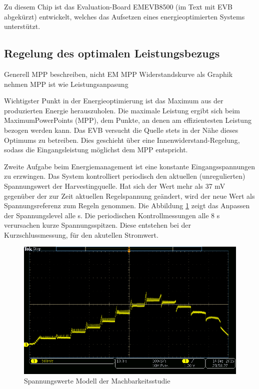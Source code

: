 
Zu diesem Chip ist das Evaluation-Board EMEVB8500 (im Text mit EVB abgekürzt) entwickelt, welches das Aufsetzen eines energieoptimierten Systems unterstützt. 


\subsection{Regelung des optimalen Leistungsbezugs}

Generell MPP beschreiben, nicht EM MPP
Widerstandskurve als Graphik nehmen
MPP ist wie Leistungsanpasung

Wichtigster Punkt in der Energieoptimierung ist das Maximum aus der produzierten Energie herauszuholen. Die maximale Leistung ergibt sich beim MaximumPowerPoints (MPP), dem Punkte, an denen am effizientesten Leistung bezogen werden kann. 
Das EVB versucht die Quelle stets in der Nähe dieses Optimums zu betreiben. Dies geschieht über eine Innenwiderstand-Regelung, sodass die Eingangsleistung möglichst dem MPP entspricht.

Zweite Aufgabe beim Energiemanagement ist eine konstante Eingangsspannungen zu erzwingen. Das System kontrolliert periodisch den aktuellen (unregulierten) Spannungswert der Harvestingquelle. Hat sich der Wert mehr als 37 mV gegenüber der zur Zeit aktuellen Regelspannung geändert, wird der neue Wert als Spannungsreferenz zum Regeln genommen. Die Abbildung \ref{RegelungSpannung} zeigt das Anpassen der Spannungslevel alle s. Die periodischen Kontrollmessungen alle 8 s verursachen kurze Spannungsspitzen. Diese entstehen bei der Kurzschlussmessung, für den akutellen Stromwert.


\begin{figure}    
    \includegraphics{2TheoretischeGrundlagen/imag/RegelungVHRV.png}
    \caption{Spannungswerte Modell der Machbarkeitsstudie}\label{RegelungSpannung} 
\end{figure}

